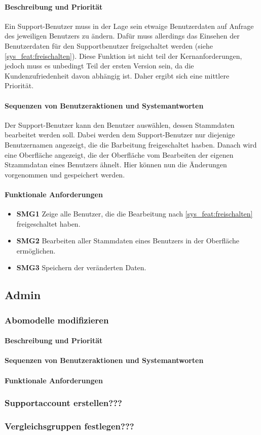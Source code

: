 \paragraph{Beschreibung und Priorität}
Ein Support-Benutzer muss in der Lage sein etwaige Benutzerdaten auf Anfrage des jeweiligen Benutzers zu ändern. Dafür muss allerdings das Einsehen der Benutzerdaten für den Supportbenutzer freigschaltet werden (siehe \ref{sys_feat:freischalten}). Diese Funktion ist nicht teil der Kernanforderungen, jedoch muss es unbedingt Teil der ersten Version sein, da die Kundenzufriedenheit davon abhängig ist. Daher ergibt sich eine mittlere Priorität.
\paragraph{Sequenzen von Benutzeraktionen und Systemantworten}
Der Support-Benutzer kann den Benutzer auswählen, dessen Stammdaten bearbeitet werden soll. Dabei werden dem Support-Benutzer nur diejenige Benutzernamen angezeigt, die die Barbeitung freigeschaltet hasben. Danach wird eine Oberfläche angezeigt, die der Oberfläche vom Bearbeiten der eigenen Stzammdatan eines Benutzers ähnelt. Hier können nun die Änderungen vorgenommen und gespeichert werden. 
\paragraph{Funktionale Anforderungen}
\begin{itemize}
	\item \textbf{SMG1} Zeige alle Benutzer, die die Bearbeitung nach \ref{sys_feat:freischalten} freigeschaltet haben.
	\item \textbf{SMG2} Bearbeiten aller Stammdaten eines Benutzers in der Oberfläche ermöglichen.
	\item \textbf{SMG3} Speichern der veränderten Daten. 
\end{itemize}

\subsection{Admin}
\subsubsection{Abomodelle modifizieren}
\paragraph{Beschreibung und Priorität}
\paragraph{Sequenzen von Benutzeraktionen und Systemantworten}
\paragraph{Funktionale Anforderungen}

\subsubsection{Supportaccount erstellen???}

\subsubsection{Vergleichsgruppen festlegen???}
